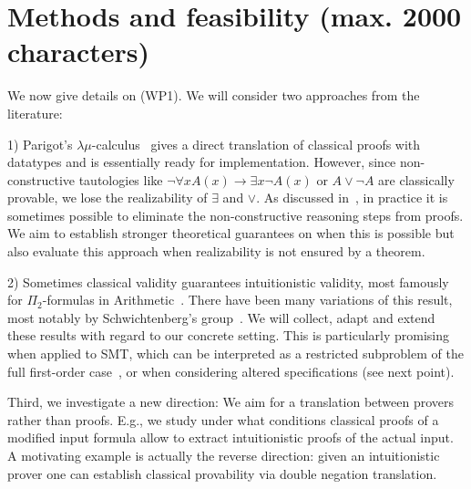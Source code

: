 \documentclass[a4paper,12pt]{article}
\begin{document}
	

\section{Methods and feasibility (max. 2000 characters)}
			
We now give details on (WP1).
We will consider two approaches from the literature:

1) Parigot's $\lambda\mu$-calculus~\cite{Parigot1} gives a direct translation of classical proofs with datatypes and is essentially ready for implementation.
However, since non-constructive tautologies like $\neg\forall xA(x)\to \exists x\neg A(x)$ or $A\vee \neg A$ are classically provable, we lose the realizability of $\exists$ and $\vee$.
As discussed in~\cite{practical}, in practice it is sometimes possible to eliminate the non-constructive reasoning steps from proofs.
We aim to establish stronger theoretical guarantees on when this is possible but also evaluate this approach when realizability is not ensured by a theorem.

2) Sometimes classical validity guarantees intuitionistic validity, most famously for $\Pi_2$-formulas in Arithmetic~\cite{Friedman}. There have been many variations of this result, most notably by Schwichtenberg's group~\cite{schwichtenberg}.
We will collect, adapt and extend these results with regard to our concrete setting. 
This is particularly promising when  {\color{blue} applied to SMT, which can be interpreted as a restricted subproblem of the full first-order case~\cite{reynolds2015counterexample}, or when} considering altered specifications (see next point).

Third, we investigate a new direction:
We aim for a translation between provers rather than proofs.
E.g., we study under what conditions classical proofs of a modified input formula allow to extract intuitionistic proofs of the actual input.
A motivating example is actually the reverse direction:
given an intuitionistic prover one can establish classical provability via double negation translation.
	
\end{document}
